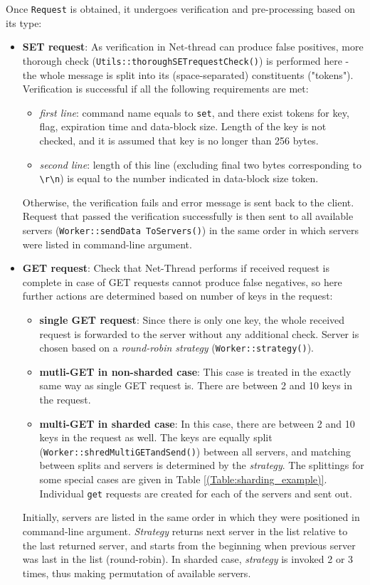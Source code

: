 \documentclass[11pt,a4paper]{article}
\begin{document}
Once \texttt{Request} is obtained, it undergoes verification and pre-processing based on its type:
\begin{itemize}
	\item \textbf{SET request}: As verification in Net-thread can produce false positives, more thorough check (\texttt{Utils::thoroughSETrequestCheck()}) is performed here - the whole message is split into its (space-separated) constituents ("tokens"). Verification is successful if all the following requirements are met:
	\begin{itemize}
		\item \textit{first line}: command name equals to \texttt{set}, and there exist tokens for key, flag, expiration time and data-block size. Length of the key is not checked, and it is assumed that key is no longer than 256 bytes.
		\item \textit{second line}: length of this line (excluding final two bytes corresponding to \texttt{\textbackslash r\textbackslash n}) is equal to the number indicated in data-block size token.
	\end{itemize}
	Otherwise, the verification fails and error message is sent back to the client. Request that passed the verification successfully is then sent to all available servers (\texttt{Worker::sendData ToServers()}) in the same order in which servers were listed in command-line argument.
	\item \textbf{GET request}: Check that Net-Thread performs if received request is complete in case of GET requests cannot produce false negatives, so here further actions are determined based on number of keys in the request:
	\begin{itemize}
		\item \textbf{single GET request}: Since there is only one key, the whole received request is forwarded to the server without any additional check. Server is chosen based on a \textit{ round-robin strategy} (\texttt{Worker::strategy()}).
		\item \textbf{mutli-GET in non-sharded case}: This case is treated in the exactly same way as single GET request is. There are between 2 and 10 keys in the request.
		\item \textbf{multi-GET in sharded case}: In this case, there are between 2 and 10 keys in the request as well. The keys are equally split (\texttt{Worker::shredMultiGETandSend()}) between all servers, and matching between splits and servers is determined by the \textit{strategy}. The splittings for some special cases are given in Table \ref{(Table:sharding_example)}. Individual \texttt{get} requests are created for each of the servers and sent out.
	\end{itemize}
	
	Initially, servers are listed in the same order in which they were positioned in command-line argument. \textit{Strategy} returns next server in the list relative to the last returned server, and starts from the beginning when previous server was last in the list (round-robin). In sharded case, \textit{strategy} is invoked 2 or 3 times, thus making permutation of available servers.
	
\end{itemize}
\end{document}
